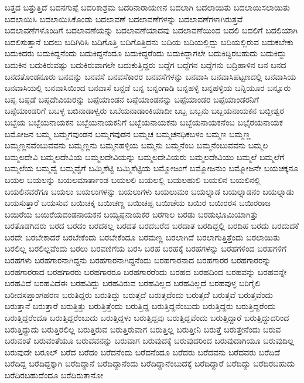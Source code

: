 {ಬತ್ತದ
ಬತ್ತುತ್ತಿದೆ
ಬದನಗುಪ್ಪೆ
ಬದರಿಕಾಶ್ರಮ
ಬದರಿನಾರಾಯಣನ
ಬದಲಾಗಿ
ಬದಲಾಯಿತು
ಬದಲಾಯಿಸಲಾಯಿತು
ಬದಲಾಯಿಸಿ
ಬದಲಾಯಿಸಿಕೊಂಡು
ಬದಲಾವಣೆ
ಬದಲಾವಣೆಗಳನ್ನು
ಬದಲಾವಣೆಗಳಾಗಿರುತ್ತವೆ
ಬದಲಾವಣೆಗಳೊಂದಿಗೆ
ಬದಲಾವಣೆಯನ್ನು
ಬದಲಾವಣೆಯಾದವು
ಬದಲಾವಣೆಯಿಂದ
ಬದಲಿ
ಬದಲಿಗೆ
ಬದಲಿಯಾಗಿ
ಬದಲಿಸುತ್ತಾನೆ
ಬದಲು
ಬದಿಗಿರಿಸಿ
ಬದಿಗೊತ್ತಿ
ಬದಿಗೊತ್ತಿದನು
ಬದಿಯ
ಬದಿಯಲ್ಲಿದ್ದು
ಬದಿಯಲ್ಲಿರುವ
ಬದುಕಬೇಕು
ಬದುಕಿದರು
ಬದುಕಿದ್ದನೆಂದು
ಬದುಕಿದ್ದನೆಂದೂ
ಬದುಕಿದ್ದರೆಂದು
ಬದುಕಿದ್ದಾಗಲೇ
ಬದುಕಿದ್ದಿರಬಹುದು
ಬದುಕಿದ್ದು
ಬದುಕಿನ
ಬದುಕಿರುವಷ್ಟು
ಬದುಕಿರುವಾಗಲೇ
ಬದುಕುತ್ತಿದ್ದರು
ಬದ್ದೆಗ
ಬದ್ದೆಗನ
ಬದ್ದೆಗನು
ಬದ್ರಿಹಾಳಿನ
ಬನ
ಬನದ
ಬನದತೊಂಡನೂರು
ಬನವನ್ನು
ಬನವಸೆ
ಬನವಸೆಕಾರರ
ಬನವಸೆಗಳನ್ನು
ಬನವಾಸಿ
ಬನವಾಸಿಪಟ್ಟಣದಲ್ಲಿ
ಬನವಾಸಿಯ
ಬನವಾಸಿಯಲ್ಲಿ
ಬನವಾಸಿಯಿಂದ
ಬನವಾಸೆ
ಬನ್ದಡೆ
ಬನ್ನ
ಬನ್ನಂಗಾಡಿ
ಬನ್ನಹಳ್ಳಿ
ಬನ್ನಹಳ್ಳಿಯ
ಬನ್ನಿಯೂರ
ಬನ್ನೂರು
ಬಪ್ಪ
ಬಪ್ಪಡೆ
ಬಪ್ಪದೇವಿಯರನ್ನು
ಬಪ್ಪೆಯಾಂಡನ
ಬಪ್ಪೆಯಾಂಡನನ್ನು
ಬಪ್ಪೆಯಾಂಡರ
ಬಪ್ಪೆಯಾಂಡರನಿಗೆ
ಬಪ್ಪೆಯಾಂಡರಿಗೆ
ಬಬಳ್ಳ
ಬಬಿನಾಡಾಳ್ವರು
ಬಬೆಯನಾಡಾಂಕಿಯಾದೀ
ಬಬ್ಬ
ಬಬ್ಬನು
ಬಬ್ಬಯನಾಯಕನ
ಬಬ್ಬೀಶ್ವರ
ಬಬ್ಬೆಯ
ಬಬ್ಬೆಯನಾಯಕನ
ಬಬ್ಬೆಯನಾಯಕನಿಗೆ
ಬಬ್ಬೆಯನಾಯಕನು
ಬಬ್ಬೆಯನಾಯಕನೆಂಬ
ಬಭೈರಯನಾಯಕ
ಬಮೋಜನ
ಬಮ್ಮ
ಬಮ್ಮಗವುಂಡನ
ಬಮ್ಮಗವುಡನ
ಬಮ್ಮಚ
ಬಮ್ಮಚನಧಿಕಬಳಂ
ಬಮ್ಮಣ
ಬಮ್ಮಣ್ಣ
ಬಮ್ಮಣ್ಣನವೆಂಬುವವನು
ಬಮ್ಮಣ್ಣನು
ಬಮ್ಮನಹಳ್ಳಿಯ
ಬಮ್ಮನು
ಬಮ್ಮನೆಂಬ
ಬಮ್ಮನೆಂಬುವವನು
ಬಮ್ಮಲ
ಬಮ್ಮಲದೇವಿ
ಬಮ್ಮಲದೇವಿಯ
ಬಮ್ಮಲದೇವಿಯನ್ನು
ಬಮ್ಮಲದೇವಿಯರು
ಬಮ್ಮಲದೇವಿಯು
ಬಮ್ಮಲೆ
ಬಮ್ಮಲೆಗೆ
ಬಮ್ಮಲೆಯ
ಬಮ್ಮವ್ವೆ
ಬಮ್ಮವ್ವೆಗೆ
ಬಮ್ಮಿಶೆಟ್ಟಿ
ಬಮ್ಮಿಸೆಟ್ಟಿಯ
ಬಮ್ಮೋಜಂಗೆ
ಬಮ್ಮೋಜನುಂ
ಬಮ್ಮೋಜನೇ
ಬಯಚಕ್ಕನೂ
ಬಯಲ
ಬಯಲನ್ನು
ಬಯಲಮಾರ್ತಾಂಡ
ಬಯಲಲಿ
ಬಯಲಲ್ಲಿ
ಬಯಲಹುಲಿ
ಬಯಲಿನ
ಬಯಲಿನಲ್ಲಿ
ಬಯಲಿನವರೆಗೂ
ಬಯಲು
ಬಯಲುಗಳನ್ನು
ಬಯಲುಗಳು
ಬಯಲುಮಂ
ಬಯಲ್ನಾಡ
ಬಯಲ್ನಾಡನಂ
ಬಯಲ್ನಾಡು
ಬಯಸುತ್ತಾರೆ
ಬಯಸುವ
ಬಯಿಚಕ್ಕ
ಬಯಿಚಣ್ಣ
ಬಯಿಚಪ್ಪ
ಬಯಿಚೆಯ
ಬಯಿರ
ಬಯಿರರಸ
ಬಯಿರರಾಜ
ಬಯಿರೆಯ
ಬಯಿರೆಯದಂಡನಾಯಕನ
ಬಯ್ಯಪ್ಪನಾಯಕರ
ಬರಗಾಲ
ಬರಡು
ಬರಡುಭೂಮಿಯಾಗಿತ್ತು
ಬರತೊಡಗಿದರು
ಬರದ
ಬರದಂ
ಬರದಕಲ್ಲ
ಬರದತ
ಬರದಬರೆದ
ಬರದಾತ
ಬರದಿದ್ದಲ್ಲಿ
ಬರದಿಹ
ಬರದು
ಬರದುದಕೆ
ಬರದೇ
ಬರಬೇಕಾದರೆ
ಬರಬೇಕೆಂದು
ಬರಬೇಕೆಂದೂ
ಬರಮಣ್ಣ
ಬರಲಾಗಿದೆ
ಬರಲಾಗುತ್ತಿತ್ತೆಂದು
ಬರಲಾಯಿತು
ಬರಲಿಲ್ಲ
ಬರಲಿಲ್ಲವೆಂದು
ಬರಲು
ಬರವಣಿಗೆಯ
ಬರಸಿ
ಬರಹ
ಬರಹಕ್ಕೆ
ಬರಹಗಳನ್ನು
ಬರಹಗಳಿಂದ
ಬರಹಗಳಿಗೆ
ಬರಹಗಳು
ಬರಹಗಾರನಾಗಿದ್ದನು
ಬರಹಗಾರನಾಗಿದ್ದನೆಂದು
ಬರಹಗಾರನಾದ
ಬರಹಗಾರರ
ಬರಹಗಾರರನ್ನು
ಬರಹಗಾರರಾದ
ಬರಹಗಾರರು
ಬರಹಗಾರರೂ
ಬರಹಗಾರರೆಂದು
ಬರಹದ
ಬರಹದಿಂದ
ಬರಹವನ್ನು
ಬರಹವನ್ನೇ
ಬರಹವಿದೆ
ಬರಹವಿದೆಈ
ಬರಹವಿದ್ದು
ಬರಹವಿರುವ
ಬರಹವಿಲ್ಲದ
ಬರಹವಿಲ್ಲದೆ
ಬರಹವುಳ್ಳ
ಬರಿಗೈಲಿ
ಬರೀದಸಪ್ತಾಂಗಹರಣ
ಬರುತಿದ್ದರು
ಬರುತಿದ್ದು
ಬರುತ್ತದೆ
ಬರುತ್ತದೆಂದು
ಬರುತ್ತದೆೆ
ಬರುತ್ತವೆ
ಬರುತ್ತವೆಂದು
ಬರುತ್ತಾನೆ
ಬರುತ್ತಾರೆ
ಬರುತ್ತಿತ್ತು
ಬರುತ್ತಿತ್ತೆಂದು
ಬರುತ್ತಿದ್ದ
ಬರುತ್ತಿದ್ದನೆಂಬುದು
ಬರುತ್ತಿದ್ದರು
ಬರುತ್ತಿದ್ದರೆಂದು
ಬರುತ್ತಿದ್ದರೆಂದೂ
ಬರುತ್ತಿದ್ದರೆಂಬುದು
ಬರುತ್ತಿದ್ದಳು
ಬರುತ್ತಿದ್ದವು
ಬರುತ್ತಿದ್ದವೆಂದು
ಬರುತ್ತಿದ್ದಾರೆ
ಬರುತ್ತಿದ್ದುದರಿಂದ
ಬರುತ್ತಿದ್ದುದು
ಬರುತ್ತಿರಲಿಲ್ಲ
ಬರುತ್ತಿರುವ
ಬರುತ್ತಿರುವಾಗ
ಬರುತ್ತಿಲ್ಲ
ಬರುತ್ತೀನಿ
ಬರುತ್ತೆ
ಬರುತ್ತೇನೆಂದು
ಬರುವ
ಬರುವಂತೆ
ಬರುವಂತೆಯೂ
ಬರುವವನನ್ನು
ಬರುವಾಗ
ಬರುವುದಕ್ಕೆ
ಬರುವುದರಿಂದ
ಬರುವುದಾಗಿಯೂ
ಬರುವುದಿಲ್ಲ
ಬರುವುದೇ
ಬರೂಲ್
ಬರೆದ
ಬರೆದಂ
ಬರೆದನೆಂದು
ಬರೆದನೆಂದೂ
ಬರೆದರು
ಬರೆದವನು
ಬರೆದವರು
ಬರೆದಿದೆ
ಬರೆದಿದ್ದ
ಬರೆದಿದ್ದಕ್ಕಾಗಿ
ಬರೆದಿದ್ದಾನೆ
ಬರೆದಿದ್ದಾನೆಂದು
ಬರೆದಿದ್ದಾನೆಂಬುದಕ್ಕೆ
ಬರೆದಿದ್ದಾರೆ
ಬರೆದಿದ್ದು
ಬರೆದಿರಬಹುದು
ಬರೆದಿರಬಹುದೆಂದೂ
ಬರೆದಿರುತಾನೋ
}
